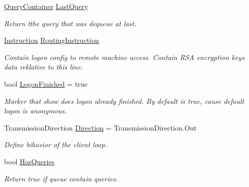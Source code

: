 \begin{DoxyCompactItemize}
\mbox{\hyperlink{struct_pipes_provider_1_1_client_1_1_query_container}{Query\+Container}} \mbox{\hyperlink{class_pipes_provider_1_1_client_1_1_transmission_line_ac4b9855c5d9aa2a9f6289c2eb43f6996}{Last\+Query}}
\begin{DoxyCompactList}\small\item\em Return tthe query that was dequeue at last. \end{DoxyCompactList}\item 
\mbox{\hyperlink{class_pipes_provider_1_1_networking_1_1_routing_1_1_instruction}{Instruction}} \mbox{\hyperlink{class_pipes_provider_1_1_client_1_1_transmission_line_a3e840e02a896759c61ed428e013bc1e2}{Routing\+Instruction}}
\begin{DoxyCompactList}\small\item\em Contain logon config to remote machine access. Contain R\+SA encryption keys data reklative to this line. \end{DoxyCompactList}\item 
bool \mbox{\hyperlink{class_pipes_provider_1_1_client_1_1_transmission_line_a02c3eec4a1041d7b57ee5df00559d251}{Logon\+Finished}} = true
\begin{DoxyCompactList}\small\item\em Marker that show does logon already finished. By default is true, cause default logon is anonymous. \end{DoxyCompactList}\item 
Transmission\+Direction \mbox{\hyperlink{class_pipes_provider_1_1_client_1_1_transmission_line_aa7e1cb4797230b8dd9fcefdfe7dc5dca}{Direction}} = Transmission\+Direction.\+Out
\begin{DoxyCompactList}\small\item\em Define bihavior of the client loop. \end{DoxyCompactList}\item 
bool \mbox{\hyperlink{class_pipes_provider_1_1_client_1_1_transmission_line_a3f5625beace2f8ea5ec3cc46000b8cc3}{Has\+Queries}}
\begin{DoxyCompactList}\small\item\em Return true if queue contain queries. \end{DoxyCompactList}\end{DoxyCompactItemize}
